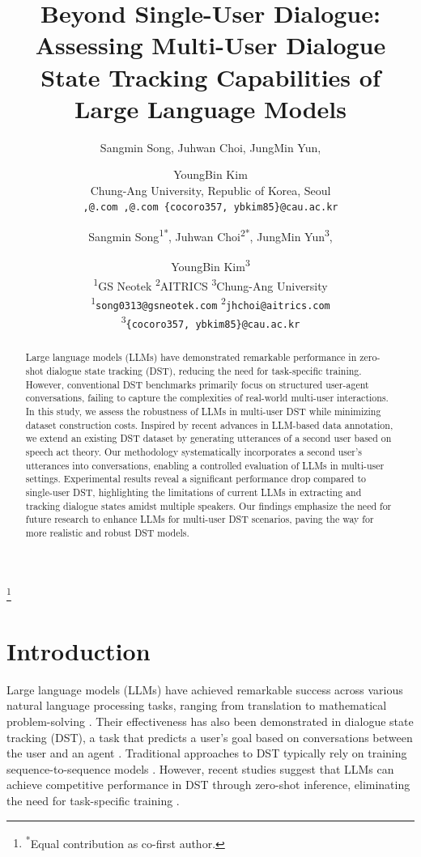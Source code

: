 \documentclass[11pt]{article}
\title{Beyond Single-User Dialogue: Assessing Multi-User Dialogue State Tracking Capabilities of Large Language Models}
\author{Sangmin Song, Juhwan Choi, JungMin Yun, \and YoungBin Kim  \\
  Chung-Ang University, Republic of Korea, Seoul \\
  \texttt{,@.com ,@.com \{cocoro357, ybkim85\}@cau.ac.kr} \\
}
\author{Sangmin Song\textsuperscript{1*}, Juhwan Choi\textsuperscript{2*}, JungMin Yun\textsuperscript{3}, \and YoungBin Kim\textsuperscript{3} \\
  \textsuperscript{1}GS Neotek \quad
  \textsuperscript{2}AITRICS \quad
  \textsuperscript{3}Chung-Ang University \quad \\
  \textsuperscript{1}\texttt{song0313@gsneotek.com} 
  \quad \textsuperscript{2}\texttt{jhchoi@aitrics.com} \\ \textsuperscript{3}\texttt{\{cocoro357, ybkim85\}@cau.ac.kr}
}
\newcommand\blfootnote[1]{%
  \begingroup
  \renewcommand\thefootnote{}\footnote{#1}%
  \addtocounter{footnote}{-1}%
  \endgroup
}
\begin{document}
\maketitle

\blfootnote{\textsuperscript{*}Equal contribution as co-first author.}

\begin{abstract}
Large language models (LLMs) have demonstrated remarkable performance in zero-shot dialogue state tracking (DST), reducing the need for task-specific training. However, conventional DST benchmarks primarily focus on structured user-agent conversations, failing to capture the complexities of real-world multi-user interactions. In this study, we assess the robustness of LLMs in multi-user DST while minimizing dataset construction costs. Inspired by recent advances in LLM-based data annotation, we extend an existing DST dataset by generating utterances of a second user based on speech act theory. Our methodology systematically incorporates a second user’s utterances into conversations, enabling a controlled evaluation of LLMs in multi-user settings. Experimental results reveal a significant performance drop compared to single-user DST, highlighting the limitations of current LLMs in extracting and tracking dialogue states amidst multiple speakers. Our findings emphasize the need for future research to enhance LLMs for multi-user DST scenarios, paving the way for more realistic and robust DST models.
\end{abstract}

\section{Introduction}
\label{sec:intro}

Large language models (LLMs) have achieved remarkable success across various natural language processing tasks, ranging from translation to mathematical problem-solving \cite{brown2020language, achiam2023gpt, dubey2024llama, team2024gemma, hurst2024gpt}. Their effectiveness has also been demonstrated in dialogue state tracking (DST), a task that predicts a user’s goal based on conversations between the user and an agent \cite{jacqmin2022you}. Traditional approaches to DST typically rely on training sequence-to-sequence models \cite{heck2020trippy, campagna2020zero, li2021zero}. However, recent studies suggest that LLMs can achieve competitive performance in DST through zero-shot inference, eliminating the need for task-specific training \cite{heck2023chatgpt}.
\end{document}
